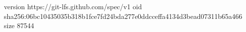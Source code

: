 version https://git-lfs.github.com/spec/v1
oid sha256:06bc10435035b318b1fce7fd24bda277e0ddcceffa4134d3bead07311b65a466
size 87544
